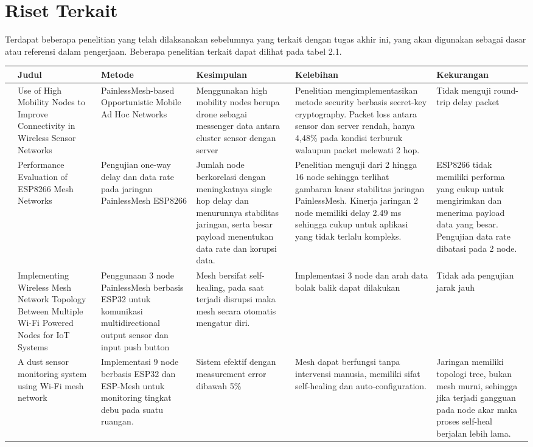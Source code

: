 \section{Riset Terkait}
Terdapat beberapa penelitian yang telah dilaksanakan sebelumnya yang terkait dengan tugas akhir ini, yang akan digunakan sebagai dasar atau referensi dalam pengerjaan. Beberapa penelitian terkait dapat dilihat pada tabel 2.1.
\pagebreak
\begin{center}
	\footnotesize
	\begin{longtable}{|p{0.5cm}|p{2cm}|p{2cm}|p{2cm}|p{2cm}|p{2cm}|}
		\hline
		&\textbf{Judul}&\textbf{Metode}&\textbf{Kesimpulan}&\textbf{Kelebihan}&\textbf{Kekurangan}\\
		\hline
		\cite{santosUseHighMobility2021}&Use of High Mobility Nodes to Improve Connectivity in Wireless Sensor Networks&PainlessMesh-based Opportunistic Mobile Ad Hoc Networks&Menggunakan high mobility nodes berupa drone sebagai messenger data antara cluster sensor dengan server&Penelitian mengimplementasikan metode security berbasis secret-key cryptography. Packet loss antara sensor dan server rendah, hanya 4,48\% pada kondisi terburuk walaupun packet melewati 2 hop.
		&Tidak menguji round-trip delay packet\\
		\hline
		\cite{chiaPerformanceEvaluationESP82662019a}&Performance Evaluation of ESP8266 Mesh Networks&Pengujian one-way delay dan data rate pada jaringan PainlessMesh ESP8266& Jumlah node berkorelasi dengan meningkatnya single hop delay dan menurunnya stabilitas jaringan, serta besar payload menentukan data rate dan korupsi data.&Penelitian menguji dari 2 hingga 16 node sehingga terlihat gambaran kasar stabilitas jaringan PainlessMesh. Kinerja jaringan 2 node memiliki delay 2.49 ms sehingga cukup untuk aplikasi yang tidak terlalu kompleks.&ESP8266 tidak memiliki performa yang cukup untuk mengirimkan dan menerima payload data yang besar. Pengujian data rate dibatasi pada 2 node. \\
		\hline
		\cite{manviImplementingWirelessMesh2020}&Implementing Wireless Mesh Network Topology Between Multiple Wi-Fi Powered Nodes for IoT Systems&Penggunaan 3 node PainlessMesh berbasis ESP32 untuk komunikasi multidirectional output sensor dan input push button&Mesh bersifat self-healing, pada saat terjadi disrupsi maka mesh secara otomatis mengatur diri.&Implementasi 3 node dan arah data bolak balik dapat dilakukan&Tidak ada pengujian jarak jauh\\
		\hline
		\cite{guoDustSensorMonitoring2021}&A dust sensor monitoring system using Wi-Fi mesh network&Implementasi 9 node berbasis ESP32 dan ESP-Mesh untuk monitoring tingkat debu pada suatu ruangan.&Sistem efektif dengan measurement error dibawah 5\%&Mesh dapat berfungsi tanpa intervensi manusia, memiliki sifat self-healing dan auto-configuration.& Jaringan memiliki topologi tree, bukan mesh murni, sehingga jika terjadi gangguan pada node akar maka proses self-heal berjalan lebih lama.\\
		\hline
	\end{longtable}
\end{center}

